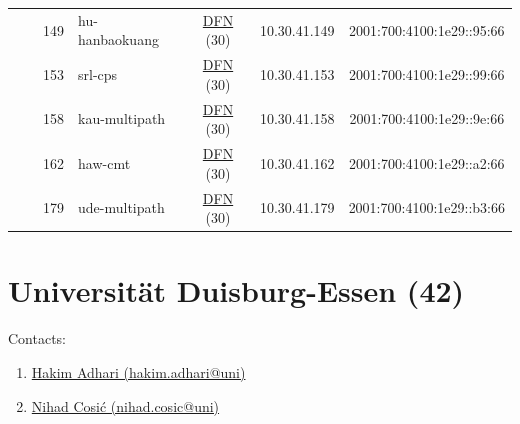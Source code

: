 \begin{small}
\begin{center}
\begin{longtable}{|c|c|c|c|c|c|c|c|}
  &  & \tiny{149} & \multicolumn{1}{|l|}{\tiny{hu-hanbaokuang}} & \multicolumn{2}{|c|}{\tiny{\href{https://www.dfn.de}{DFN} (30)}} & \tiny{10.30.41.149} & \tiny{2001:700:4100:1e29::95:66} \\* \cline{3-3}\cline{4-4}\cline{5-5}\cline{6-6}\cline{7-7}\cline{8-8}
  &  & \tiny{153} & \multicolumn{1}{|l|}{\tiny{srl-cps}} & \multicolumn{2}{|c|}{\tiny{\href{https://www.dfn.de}{DFN} (30)}} & \tiny{10.30.41.153} & \tiny{2001:700:4100:1e29::99:66} \\* \cline{3-3}\cline{4-4}\cline{5-5}\cline{6-6}\cline{7-7}\cline{8-8}
  &  & \tiny{158} & \multicolumn{1}{|l|}{\tiny{kau-multipath}} & \multicolumn{2}{|c|}{\tiny{\href{https://www.dfn.de}{DFN} (30)}} & \tiny{10.30.41.158} & \tiny{2001:700:4100:1e29::9e:66} \\* \cline{3-3}\cline{4-4}\cline{5-5}\cline{6-6}\cline{7-7}\cline{8-8}
  &  & \tiny{162} & \multicolumn{1}{|l|}{\tiny{haw-cmt}} & \multicolumn{2}{|c|}{\tiny{\href{https://www.dfn.de}{DFN} (30)}} & \tiny{10.30.41.162} & \tiny{2001:700:4100:1e29::a2:66} \\* \cline{3-3}\cline{4-4}\cline{5-5}\cline{6-6}\cline{7-7}\cline{8-8}
  &  & \tiny{179} & \multicolumn{1}{|l|}{\tiny{ude-multipath}} & \multicolumn{2}{|c|}{\tiny{\href{https://www.dfn.de}{DFN} (30)}} & \tiny{10.30.41.179} & \tiny{2001:700:4100:1e29::b3:66} \\ \hline
\end{longtable}
\end{center}
\end{small}



\section{Universität Duisburg-Essen (42)}
\label{sec:UDE}

Contacts:\begin{enumerate}
 \item {}\href{mailto:hakim.adhari@uni}{Hakim Adhari (hakim.adhari@uni)}
 \item {}\href{mailto:nihad.cosic@uni}{Nihad Cosić (nihad.cosic@uni)}
\end{enumerate}

